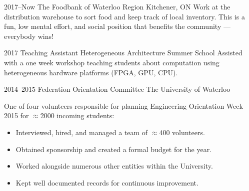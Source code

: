 \documentclass[a4paper,nocolors]{cv-friggeri-ben}
\begin{document}
\begin{entrylist}

\entry
    {2017--Now}
    {The Foodbank of Waterloo Region}
    {Kitchener, ON}
    {Work at the distribution warehouse to sort food and keep track of
    local inventory. This is a fun, low mental effort, and social position that
    benefits the community --- everybody wins!}

\entry
    {2017}
    {Teaching Assistant}
    {Heterogeneous Architecture Summer School}
    {Assisted with a one week workshop teaching students about computation using
    heterogeneous hardware platforms (FPGA, GPU, CPU).}

\entry
    {2014--2015}
    {Federation Orientation Committee}
    {The University of Waterloo}
    {One of four volunteers responsible for planning Engineering Orientation
    Week 2015 for $\approx$2000 incoming students:
    \begin{itemize}
        \item Interviewed, hired, and managed a team of $\approx$400 volunteers.
        \item Obtained sponsorship and created a formal budget for the year.
        \item Worked alongside numerous other entities within the University.
        \item Kept well documented records for continuous improvement.
    \end{itemize}}


\end{entrylist}


\end{document}
